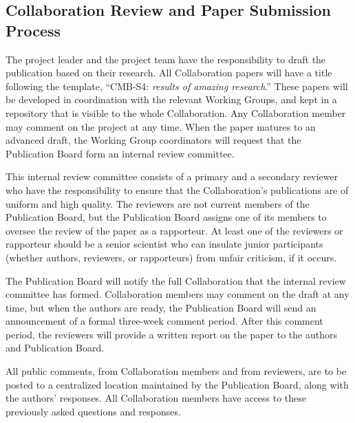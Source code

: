 \documentclass[12pt]{article}
\newcommand{\Comment}[1]{\textcolor{Blue}{(Comment: #1)}}
\newcommand\collabname{CMB-S4}
\begin{document}
\subsection{Collaboration Review and Paper Submission Process}
 
The project leader and the project team have the responsibility to draft the publication based on their research.  All Collaboration papers will have a title following the template, ``\collabname: \textit{results of amazing research}.''  These papers will be developed in coordination with the relevant Working Groups, and kept in a repository that is visible to the whole Collaboration.  Any Collaboration member may comment on the project at any time.  When the paper matures to an advanced draft, the Working Group coordinators will request that the Publication Board form an internal review committee.  

This internal review committee consists of a primary and a secondary reviewer who have the responsibility to ensure that the Collaboration's publications are of uniform and high quality.  The reviewers are not current members of the Publication Board, but the Publication Board assigns one of its members to oversee the review of the paper as a rapporteur.  At least one of the reviewers or rapporteur should be a senior scientist who can insulate junior participants (whether authors, reviewers, or rapporteurs) from unfair criticism, if it occurs.

The Publication Board will notify the full Collaboration that the internal review committee has formed.  Collaboration members may comment on the draft at any time, but when the authors are ready, the Publication Board will send an announcement of a formal three-week comment period.  After this comment period, the reviewers will provide a written report on the paper to the authors and Publication Board.

All public comments, from Collaboration members and from reviewers, are to be posted to a centralized location maintained by the Publication Board, along with the authors' responses.  All Collaboration members have access to these previously asked questions and responses.
\end{document}
